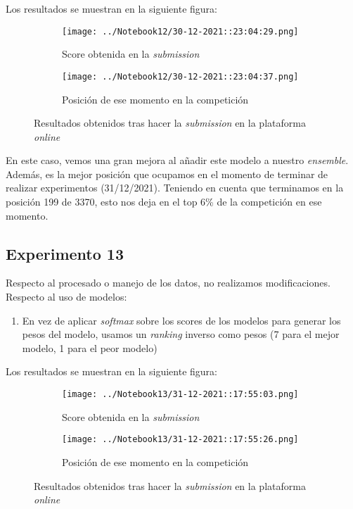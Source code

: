 \documentclass[11pt]{article}
\begin{document}
Los resultados se muestran en la siguiente figura:

\begin{figure}[H]
    \centering

    \begin{subfigure}[b]{0.45 \textwidth}
        \texttt{[image: ../Notebook12/30-12-2021::23:04:29.png]}
        \caption{Score obtenida en la \emph{submission}}
    \end{subfigure}
    \begin{subfigure}[b]{0.45 \textwidth}
        \texttt{[image: ../Notebook12/30-12-2021::23:04:37.png]}
        \caption{Posición de ese momento en la competición}
    \end{subfigure}

    \caption{Resultados obtenidos tras hacer la \emph{submission} en la plataforma \emph{online}}
\end{figure}

En este caso, vemos una gran mejora al añadir este modelo a nuestro \emph{ensemble}. Además, es la mejor posición que ocupamos en el momento de terminar de realizar experimentos (31/12/2021). Teniendo en cuenta que terminamos en la posición 199 de 3370, esto nos deja en el top 6\% de la competición en ese momento.

\pagebreak

\subsection{Experimento 13}

Respecto al procesado o manejo de los datos, no realizamos modificaciones. Respecto al uso de modelos:

\begin{enumerate}
    \item En vez de aplicar \emph{softmax} sobre los scores de los modelos para generar los pesos del modelo, usamos un \emph{ranking} inverso como pesos (7 para el mejor modelo, 1 para el peor modelo)
\end{enumerate}

Los resultados se muestran en la siguiente figura:

\begin{figure}[H]
    \centering

    \begin{subfigure}[b]{0.45 \textwidth}
        \texttt{[image: ../Notebook13/31-12-2021::17:55:03.png]}
        \caption{Score obtenida en la \emph{submission}}
    \end{subfigure}
    \begin{subfigure}[b]{0.45 \textwidth}
        \texttt{[image: ../Notebook13/31-12-2021::17:55:26.png]}
        \caption{Posición de ese momento en la competición}
    \end{subfigure}

    \caption{Resultados obtenidos tras hacer la \emph{submission} en la plataforma \emph{online}}
\end{figure}
\end{document}
